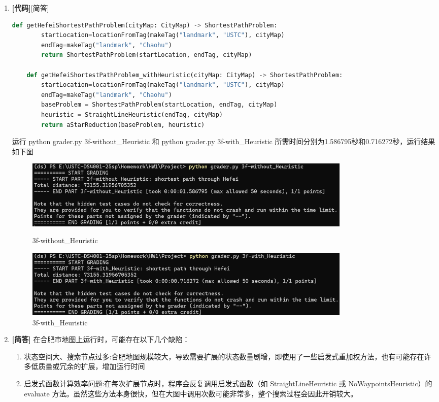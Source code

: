 \documentclass{article}
\begin{document}
\begin{enumerate}[label=(\alph*), start=6]
    \item \textbf{[代码]}{[简答]} %
    \begin{lstlisting}[language=Python]
    def getHefeiShortestPathProblem(cityMap: CityMap) -> ShortestPathProblem:
    	startLocation=locationFromTag(makeTag("landmark", "USTC"), cityMap)
    	endTag=makeTag("landmark", "Chaohu")
    	return ShortestPathProblem(startLocation, endTag, cityMap)
    
    def getHefeiShortestPathProblem_withHeuristic(cityMap: CityMap) -> ShortestPathProblem:
    	startLocation=locationFromTag(makeTag("landmark", "USTC"), cityMap)
    	endTag=makeTag("landmark", "Chaohu")
    	baseProblem = ShortestPathProblem(startLocation, endTag, cityMap)
    	heuristic = StraightLineHeuristic(endTag, cityMap)
    	return aStarReduction(baseProblem, heuristic)
    \end{lstlisting}
    运行 python grader.py 3f-without\_Heuristic 和 python grader.py 3f-with\_Heuristic 所需时间分别为1.586795秒和0.716272秒，运行结果如下图
    \FloatBarrier
    \begin{figure}[h]
    	\centering
    	\includegraphics[width=0.8\textwidth]{3f-without_Heuristic.png}
    	\caption{3f-without\_Heuristic}
    	\includegraphics[width=0.8\textwidth]{3f-with_Heuristic.png}
    	\caption{3f-with\_Heuristic}
    \end{figure}
    \FloatBarrier
    \item \textbf{[简答]} %
    在合肥市地图上运行时，可能存在以下几个缺陷：
    \begin{enumerate}
    	\item 状态空间大、搜索节点过多:合肥地图规模较大，导致需要扩展的状态数量剧增，即使用了一些启发式重加权方法，也有可能存在许多低质量或冗余的扩展，增加运行时间
    	\item 启发式函数计算效率问题:在每次扩展节点时，程序会反复调用启发式函数（如 StraightLineHeuristic 或 NoWaypointsHeuristic）的 evaluate 方法。虽然这些方法本身很快，但在大图中调用次数可能非常多，整个搜索过程会因此开销较大。

\end{enumerate}
\end{enumerate}
\end{document}
